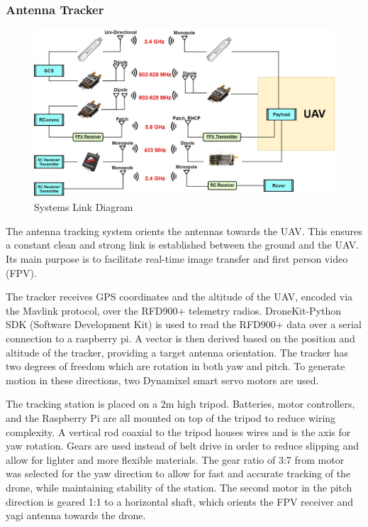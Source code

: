 \subsubsection{Antenna Tracker}

\begin{figure}[ht]\centering
\includegraphics[width=\linewidth]{figures/Systems_Link_Diagram.png}
\caption{Systems Link Diagram}
\label{fig:systems_link_diagram}
\end{figure}


The antenna tracking system orients the antennas towards the UAV. This ensures a constant clean and strong link is established between the ground and the UAV. Its main purpose is to facilitate real-time image transfer and first person video (FPV).

The tracker receives GPS coordinates and the altitude of the UAV, encoded via the Mavlink protocol, over the RFD900+ telemetry radios. DroneKit-Python SDK (Software Development Kit) is used to read the RFD900+ data over a serial connection to a raspberry pi. A vector is then derived based on the position and altitude of the tracker, providing a target antenna orientation. The tracker has two degrees of freedom which are rotation in both yaw and pitch. To generate motion in these directions, two Dynamixel smart servo motors are used. 

The tracking station is placed on a 2m high tripod. Batteries, motor controllers, and the Raspberry Pi are all mounted on top of the tripod to reduce wiring complexity. A vertical rod coaxial to the tripod houses wires and is the axis for yaw rotation. Gears are used instead of belt drive in order to reduce slipping and allow for lighter and more flexible materials. The gear ratio of 3:7 from motor was selected for the yaw direction to allow for fast and accurate tracking of the drone, while maintaining stability of the station. The second motor in the pitch direction is geared 1:1 to a horizontal shaft, which orients the FPV receiver and yagi antenna towards the drone. 

